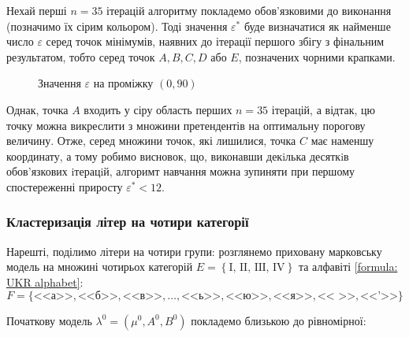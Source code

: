 Нехай перші $n=35$ ітерацій алгоритму покладемо обов'язковими до виконання (позначимо їх сірим кольором). Тоді значення $\varepsilon^*$ буде визначатися як найменше число $\varepsilon$ серед точок мінімумів, наявних до ітерації першого збігу з фінальним результатом, тобто серед точок $A,B,C,D$ або $E$, позначених чорними крапками.

\begin{figure}[H]
    \vspace{-0.7cm}
    \caption{Значення $\varepsilon$ на проміжку $(0,90)$}
    \label{figure: III epsilon (0,90)}
\end{figure}

Однак, точка $A$ входить у сіру область перших $n=35$ ітерацій, а відтак, цю точку можна викреслити з множини претендентів на оптимальну порогову величину. Отже, серед множини точок, які лишилися, точка $C$ має наменшу координату, а тому робимо висновок, що, виконавши декiлька десяткiв обов’язкових iтерацiй, алгоримт навчання можна зупиняти при першому спостереженні приросту $\varepsilon^*<12$.

\subsubsection{Кластеризація літер на чотири категорії}
\label{section: IV classes}

Нарешті, поділимо літери на чотири групи: розглянемо приховану марковську модель на множині чотирьох категорій $E=\left\{\text{I},\, \text{II},\, \text{IIІ},\, \text{IV}\right\}$ та алфавіті \eqref{formula: UKR alphabet}:
\begin{equation*}
    F=\{\text{<<а>>},\text{<<б>>},\text{<<в>>},\ldots,\text{<<ь>>},\text{<<ю>>},\text{<<я>>},\text{<< >>},\text{<<'>>}\}
\end{equation*}

Початкову модель $\lambda^0=(\mu^0,A^0,B^0)$ покладемо близькою до рівномірної:

